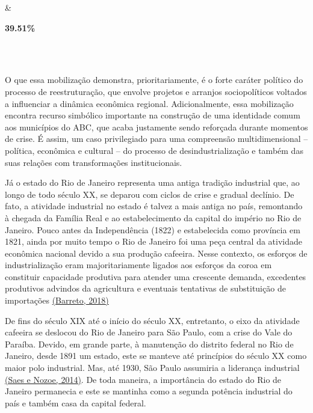 \begin{longtable}[]
\begin{minipage}[b]{\linewidth}
\end{minipage} & \begin{minipage}[b]{\linewidth}\raggedright
\textbf{39.51\%}
\end{minipage} \\
 \\
\midrule\noalign{}
\endhead
\bottomrule\noalign{}
\endlastfoot
\end{longtable}

O que essa mobilização demonstra, prioritariamente, é o forte caráter
político do processo de reestruturação, que envolve projetos e arranjos
sociopolíticos voltados a influenciar a dinâmica econômica regional.
Adicionalmente, essa mobilização encontra recurso simbólico importante
na construção de uma identidade comum aos municípios do ABC, que acaba
justamente sendo reforçada durante momentos de crise. É assim, um caso
privilegiado para uma compreensão multidimensional -- política,
econômica e cultural -- do processo de desindustrialização e também das
suas relações com transformações institucionais.

Já o estado do Rio de Janeiro representa uma antiga tradição industrial
que, ao longo de todo século XX, se deparou com ciclos de crise e
gradual declínio. De fato, a atividade industrial no estado é talvez a
mais antiga no país, remontando à chegada da Família Real e ao
estabelecimento da capital do império no Rio de Janeiro. Pouco antes da
Independência (1822) e estabelecida como província em 1821, ainda por
muito tempo o Rio de Janeiro foi uma peça central da atividade econômica
nacional devido a sua produção cafeeira. Nesse contexto, os esforços de
industrialização eram majoritariamente ligados aos esforços da coroa em
constituir capacidade produtiva para atender uma crescente demanda,
excedentes produtivos advindos da agricultura e eventuais tentativas de
substituição de importações
\href{https://www.zotero.org/google-docs/?r9UnQR}{(Barreto, 2018)}

De fins do século XIX até o início do século XX, entretanto, o eixo da
atividade cafeeira se deslocou do Rio de Janeiro para São Paulo, com a
crise do Vale do Paraíba. Devido, em grande parte, à manutenção do
distrito federal no Rio de Janeiro, desde 1891 um estado, este se
manteve até princípios do século XX como maior polo industrial. Mas, até
1930, São Paulo assumiria a liderança industrial
\href{https://www.zotero.org/google-docs/?mkI5eI}{(Saes e Nozoe, 2014)}.
De toda maneira, a importância do estado do Rio de Janeiro permanecia e
este se mantinha como a segunda potência industrial do país e também
casa da capital federal.


